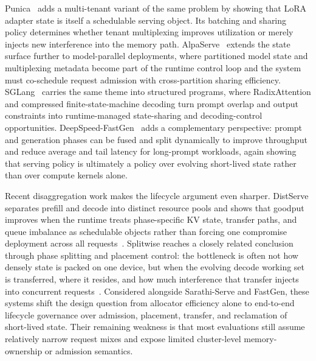\documentclass[acmsmall,screen,review]{acmart}
\begin{document}
Punica~\cite{chen2024punica} adds a multi-tenant variant of the same problem by showing that LoRA adapter state is itself a schedulable serving object. Its batching and sharing policy determines whether tenant multiplexing improves utilization or merely injects new interference into the memory path. AlpaServe~\cite{li2023alpaserve} extends the state surface further to model-parallel deployments, where partitioned model state and multiplexing metadata become part of the runtime control loop and the system must co-schedule request admission with cross-partition sharing efficiency. SGLang~\cite{zheng2023sglang} carries the same theme into structured programs, where RadixAttention and compressed finite-state-machine decoding turn prompt overlap and output constraints into runtime-managed state-sharing and decoding-control opportunities. DeepSpeed-FastGen~\cite{holmes2024fastgen} adds a complementary perspective: prompt and generation phases can be fused and split dynamically to improve throughput and reduce average and tail latency for long-prompt workloads, again showing that serving policy is ultimately a policy over evolving short-lived state rather than over compute kernels alone.

Recent disaggregation work makes the lifecycle argument even sharper. DistServe separates prefill and decode into distinct resource pools and shows that goodput improves when the runtime treats phase-specific KV state, transfer paths, and queue imbalance as schedulable objects rather than forcing one compromise deployment across all requests~\cite{zhong2024distserve}. Splitwise reaches a closely related conclusion through phase splitting and placement control: the bottleneck is often not how densely state is packed on one device, but when the evolving decode working set is transferred, where it resides, and how much interference that transfer injects into concurrent requests~\cite{patel2024splitwise}. Considered alongside Sarathi-Serve and FastGen, these systems shift the design question from allocator efficiency alone to end-to-end lifecycle governance over admission, placement, transfer, and reclamation of short-lived state. Their remaining weakness is that most evaluations still assume relatively narrow request mixes and expose limited cluster-level memory-ownership or admission semantics.
\end{document}
